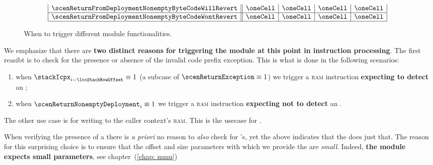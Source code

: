 \begin{figure}[!h]
\[\begin{array}{|l|lc||c|c|c|c|c|c|}
			\multicolumn{3}{|l||}{\scenReturnFromDeploymentNonemptyByteCodeWillRevert }                                                                                     & \oneCell       & \oneCell        & \oneCell       & \oneCell            \\ \hline
			\multicolumn{3}{|l||}{\scenReturnFromDeploymentNonemptyByteCodeWontRevert }                                                                                     & \oneCell       & \oneCell        & \oneCell       & \oneCell            \\ \hline
		\end{array}
	\]
	\label{hub: instruction handling: halting: return: desired trigger flags}
	\caption{When to trigger different module functionalities.}
\end{figure}

\saNote{} \label{hub: instruction handling: halting: return: desired trigger flags}
We emphasize that there are \textbf{two distinct reasons for triggering the \mmuMod{} module at this point in instruction processing}.
The first reasibt is to check for the presence or absence of the invalid code prefix exception.
This is what is done in the following scenarios:
\begin{enumerate}
	\item when $\stackIcpx _{i - \locStackRowOffset} \equiv 1$ (a subcase of $\scenReturnException \equiv 1$) we trigger a \textsc{ram} instruction \textbf{expecting to detect} an \icpxSH{};
	\item when $\scenReturnNonemptyDeployment _{i} \equiv 1$ we trigger a \textsc{ram} instruction \textbf{expecting not to detect} an \icpxSH{}.
\end{enumerate}
The other use case is for writing to the caller context's \textsc{ram}.
This is the usecase for \scenReturnFromMessageCallWillTouchRam{}.

\saNote{} \label{hub: instruction handling: halting: return: why icpx requires an mxp instruction}
When verifying the presence of a \icpxSH{} there is \emph{a priori} no reason to \emph{also} check for \mxpxSH{}'s, yet the above indicates that the \zkEvm{} does just that.
The reason for this surprising choice is to ensure that the offset and size parameters with which we provide the \mmuMod{} are \emph{small}.
Indeed, \textbf{the \mmuMod{} module expects small parameters}, see chapter~(\ref{chap: mmu})

